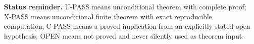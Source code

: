 \documentclass[11pt]{article}
\theoremstyle{keio}
\theoremstyle{keioinput}
\newcommand{\UPASS}{\textcolor{passgreen}{\textsf{U-PASS}}}
\newcommand{\XPASS}{\textcolor{xpassblue}{\textsf{X-PASS}}}
\newcommand{\CPASS}{\textcolor{cpassviolet}{\textsf{C-PASS}}}
\newcommand{\OPEN}{\textcolor{openred}{\textsf{OPEN}}}
\begin{document}
\vfill
\begin{statusbox}
\small
\textbf{Status reminder.} \UPASS{} means unconditional theorem with complete
proof; \XPASS{} means unconditional finite theorem with exact reproducible
computation; \CPASS{} means a proved implication from an explicitly stated
open hypothesis; \OPEN{} means not proved and never silently used as theorem
input.
\end{statusbox}
\end{document}
